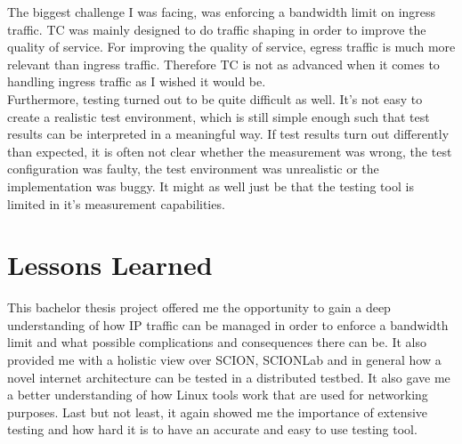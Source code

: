 The biggest challenge I was facing, was enforcing a bandwidth limit on ingress traffic. \acs{TC} was mainly designed to do traffic shaping in order to improve the quality of service. For improving the quality of service, egress traffic is much more relevant than ingress traffic. Therefore \acs{TC} is not as advanced when it comes to handling ingress traffic as I wished it would be.
\\
Furthermore, testing turned out to be quite difficult as well. It's not easy to create a realistic test environment, which is still simple enough such that test results can be interpreted in a meaningful way. If test results turn out differently than expected, it is often not clear whether the measurement was wrong, the test configuration was faulty, the test environment was unrealistic or the implementation was buggy. It might as well just be that the testing tool is limited in it's measurement capabilities. 

\section{Lessons Learned}

This bachelor thesis project offered me the opportunity to gain a deep understanding of how \acs{IP} traffic can be managed in order to enforce a bandwidth limit and what possible complications and consequences there can be. It also provided me with a holistic view over \acs{SCION}, \acs{SCIONLab} and in general how a novel internet architecture can be tested in a distributed testbed. It also gave me a better understanding of how Linux tools work that are used for networking purposes. Last but not least, it again showed me the importance of extensive testing and how hard it is to have an accurate and easy to use testing tool.
